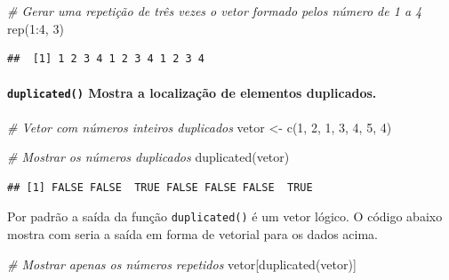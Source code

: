 \documentclass[
]{article}
\newenvironment{Shaded}{\begin{snugshade}}{\end{snugshade}}
\newcommand{\CommentTok}[1]{\textcolor[rgb]{0.56,0.35,0.01}{\textit{#1}}}
\newcommand{\DecValTok}[1]{\textcolor[rgb]{0.00,0.00,0.81}{#1}}
\newcommand{\FunctionTok}[1]{\textcolor[rgb]{0.00,0.00,0.00}{#1}}
\newcommand{\NormalTok}[1]{#1}
\newcommand{\OtherTok}[1]{\textcolor[rgb]{0.56,0.35,0.01}{#1}}
\newcommand{\SpecialCharTok}[1]{\textcolor[rgb]{0.00,0.00,0.00}{#1}}
\begin{document}
\begin{Shaded}
\begin{Highlighting}[]
\CommentTok{\# Gerar uma repetição de três vezes o vetor formado pelos número de 1 a 4}
\FunctionTok{rep}\NormalTok{(}\DecValTok{1}\SpecialCharTok{:}\DecValTok{4}\NormalTok{, }\DecValTok{3}\NormalTok{)}
\end{Highlighting}
\end{Shaded}

\begin{verbatim}
##  [1] 1 2 3 4 1 2 3 4 1 2 3 4
\end{verbatim}

\hypertarget{duplicated-mostra-a-localizauxe7uxe3o-de-elementos-duplicados.}{%
\paragraph{\texorpdfstring{\texttt{duplicated()} Mostra a localização de
elementos
duplicados.}{duplicated() Mostra a localização de elementos duplicados.}}\label{duplicated-mostra-a-localizauxe7uxe3o-de-elementos-duplicados.}}

\begin{Shaded}
\begin{Highlighting}[]
\CommentTok{\# Vetor com números inteiros duplicados}
\NormalTok{vetor }\OtherTok{\textless{}{-}} \FunctionTok{c}\NormalTok{(}\DecValTok{1}\NormalTok{, }\DecValTok{2}\NormalTok{, }\DecValTok{1}\NormalTok{, }\DecValTok{3}\NormalTok{, }\DecValTok{4}\NormalTok{, }\DecValTok{5}\NormalTok{, }\DecValTok{4}\NormalTok{)}

\CommentTok{\# Mostrar os números duplicados}
\FunctionTok{duplicated}\NormalTok{(vetor)}
\end{Highlighting}
\end{Shaded}

\begin{verbatim}
## [1] FALSE FALSE  TRUE FALSE FALSE FALSE  TRUE
\end{verbatim}

Por padrão a saída da função \texttt{duplicated()} é um vetor lógico. O
código abaixo mostra com seria a saída em forma de vetorial para os
dados acima.

\begin{Shaded}
\begin{Highlighting}[]
\CommentTok{\# Mostrar apenas os números repetidos}
\NormalTok{vetor[}\FunctionTok{duplicated}\NormalTok{(vetor)]}
\end{Highlighting}
\end{Shaded}
\end{document}
